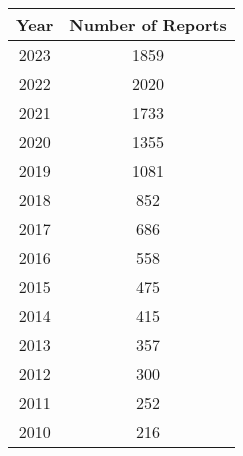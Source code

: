 \documentclass[12pt]{article}
\begin{document}
\begin{table}[h]
    \label{tab:sust_reps}
    \centering
        \begin{tabular}{cc}
            \toprule
            Year & Number of Reports\\
            \midrule
            2023 & 1859\\
            2022 & 2020\\
            2021 & 1733\\
            2020 & 1355\\
            2019 & 1081\\
            2018 & 852\\
            2017 & 686\\
            2016 & 558\\
            2015 & 475\\
            2014 & 415\\
            2013 & 357\\
            2012 & 300\\
            2011 & 252\\
            2010 & 216\\
            \bottomrule
        \end{tabular}
\end{table}

\pagebreak
\end{document}
